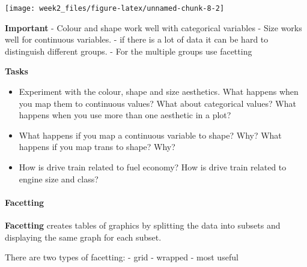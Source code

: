 \documentclass[
]{article}
\begin{document}
\begin{center}\texttt{[image: week2\_files/figure-latex/unnamed-chunk-8-2]} \end{center}

\textbf{Important} - Colour and shape work well with categorical
variables - Size works well for continuous variables. - if there is a
lot of data it can be hard to distinguish different groups. - For the
multiple groups use facetting

\textbf{Tasks}

\begin{itemize}
\item
  Experiment with the colour, shape and size aesthetics. What happens
  when you map them to continuous values? What about categorical values?
  What happens when you use more than one aesthetic in a plot?
\item
  What happens if you map a continuous variable to shape? Why? What
  happens if you map trans to shape? Why?
\item
  How is drive train related to fuel economy? How is drive train related
  to engine size and class?
\end{itemize}

\hypertarget{facetting}{%
\paragraph{Facetting}\label{facetting}}

\textbf{Facetting} creates tables of graphics by splitting the data into
subsets and displaying the same graph for each subset.

There are two types of facetting: - grid - wrapped - most useful
\end{document}
